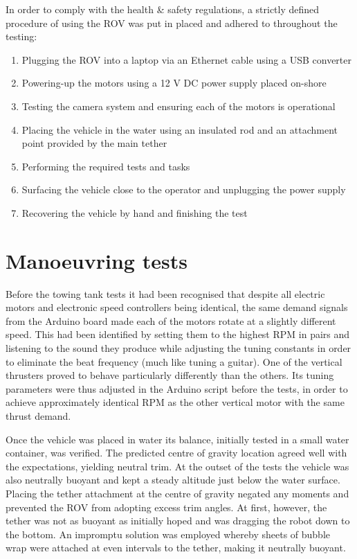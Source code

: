 In order to comply with the health \& safety regulations, a strictly defined
procedure of using the ROV was put in placed and adhered to throughout the testing:
%
\begin{enumerate}
\item Plugging the ROV into a laptop via an Ethernet cable using a USB converter
\item Powering-up the motors using a 12 V DC power supply placed on-shore
\item Testing the camera system and ensuring each of the motors is operational
\item Placing the vehicle in the water using an insulated rod and an attachment point
	provided by the main tether
\item Performing the required tests and tasks
\item Surfacing the vehicle close to the operator and unplugging the power supply
\item Recovering the vehicle by hand and finishing the test
\end{enumerate}

\section{Manoeuvring tests}\label{section:manoeuvringTests}

Before the towing tank tests it had been recognised that despite all electric
motors and electronic speed controllers being identical, the same demand signals
from the Arduino board made each of the motors rotate at a slightly different
speed. This had been identified by setting them to the highest RPM in pairs
and listening to the sound they produce while adjusting the tuning constants in order to eliminate the beat frequency (much like tuning a guitar). One of the
vertical thrusters proved to behave particularly differently than the others.
Its tuning parameters were thus adjusted in the Arduino script before the tests,
in order to achieve approximately identical RPM as the other vertical motor
with the same thrust demand.

Once the vehicle was placed in water its balance, initially tested in a small
water container, was verified. The predicted centre of gravity location agreed
well with the expectations, yielding neutral trim. At the outset of the tests
the vehicle was also neutrally buoyant and kept a steady altitude just below the
water surface. Placing the tether attachment at the centre of gravity negated
any moments and prevented the ROV from adopting excess trim angles.
At first, however, the tether was not as buoyant as initially hoped and was dragging
the robot down to the bottom. An impromptu solution was employed whereby sheets
of bubble wrap were attached at even intervals to the tether, making it neutrally
buoyant.

